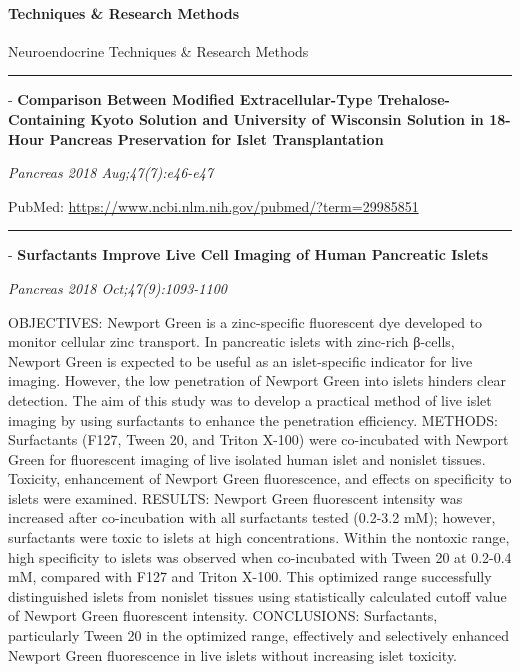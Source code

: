 \documentclass[]{article}
\let\oldparagraph\paragraph
\renewcommand{\paragraph}[1]{\oldparagraph{#1}\mbox{}}
\begin{document}
\pagebreak

\hypertarget{techniques-research-methods-1}{%
\paragraph{Techniques \& Research
Methods}\label{techniques-research-methods-1}}

Neuroendocrine Techniques \& Research Methods

\begin{center}\rule{0.5\linewidth}{\linethickness}\end{center}

 - \textbf{Comparison Between Modified Extracellular-Type
Trehalose-Containing Kyoto Solution and University of Wisconsin Solution
in 18-Hour Pancreas Preservation for Islet Transplantation}

\emph{Pancreas 2018 Aug;47(7):e46-e47}

PubMed: \url{https://www.ncbi.nlm.nih.gov/pubmed/?term=29985851}

{}

{}

\begin{center}\rule{0.5\linewidth}{\linethickness}\end{center}

 - \textbf{Surfactants Improve Live Cell Imaging of Human Pancreatic
Islets}

\emph{Pancreas 2018 Oct;47(9):1093-1100}

OBJECTIVES: Newport Green is a zinc-specific fluorescent dye developed
to monitor cellular zinc transport. In pancreatic islets with zinc-rich
β-cells, Newport Green is expected to be useful as an islet-specific
indicator for live imaging. However, the low penetration of Newport
Green into islets hinders clear detection. The aim of this study was to
develop a practical method of live islet imaging by using surfactants to
enhance the penetration efficiency. METHODS: Surfactants (F127, Tween
20, and Triton X-100) were co-incubated with Newport Green for
fluorescent imaging of live isolated human islet and nonislet tissues.
Toxicity, enhancement of Newport Green fluorescence, and effects on
specificity to islets were examined. RESULTS: Newport Green fluorescent
intensity was increased after co-incubation with all surfactants tested
(0.2-3.2 mM); however, surfactants were toxic to islets at high
concentrations. Within the nontoxic range, high specificity to islets
was observed when co-incubated with Tween 20 at 0.2-0.4 mM, compared
with F127 and Triton X-100. This optimized range successfully
distinguished islets from nonislet tissues using statistically
calculated cutoff value of Newport Green fluorescent intensity.
CONCLUSIONS: Surfactants, particularly Tween 20 in the optimized range,
effectively and selectively enhanced Newport Green fluorescence in live
islets without increasing islet toxicity.
\end{document}
